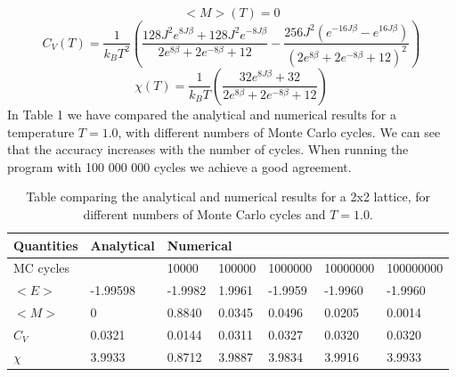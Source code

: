 \documentclass{article}
\begin{document}
$$<M>(T) = 0$$
$$C_V(T) = \frac{1}{k_B T^2}(\frac{128J^2e^{8J\beta}+128J^2e^{-8J\beta}}{ 2e^{8\beta} + 2e^{-8\beta} +12} - \frac{256J^2(e^{-16J\beta}-e^{16J\beta})}{ (2e^{8\beta} + 2e^{-8\beta} +12)^2}) $$
$$\chi (T)= \frac{1}{k_B T}(\frac{32e^{8J\beta}+32}{ 2e^{8\beta} + 2e^{-8\beta} +12 })$$
In Table 1 we have compared the analytical and numerical results for a temperature $T = 1.0$, with different numbers of Monte Carlo cycles. We can see that the accuracy increases with the number of cycles. When running the program with 100 000 000 cycles we achieve a good agreement. 
\begin{center}
\begin{table}
\centering
\label{my-label}
\begin{tabular}{|l|l|l|l|l|l|l|l|}
\hline
Quantities & \multicolumn{2}{l|}{Analytical} & \multicolumn{5}{l|}{Numerical}                    \\ \hline
MC cycles  & \multicolumn{2}{l|}{}           & 10000   & 100000 & 1000000 & 10000000 & 100000000 \\ \hline
$<E>$      & \multicolumn{2}{l|}{-1.99598}   & -1.9982 & 1.9961 & -1.9959 & -1.9960  & -1.9960   \\ \hline
$<M>$      & \multicolumn{2}{l|}{0}          & 0.8840  & 0.0345 & 0.0496  & 0.0205   & 0.0014    \\ \hline
$C_V$      & \multicolumn{2}{l|}{0.0321}     & 0.0144  & 0.0311 & 0.0327  & 0.0320   & 0.0320    \\ \hline
$\chi$     & \multicolumn{2}{l|}{3.9933}     & 0.8712  & 3.9887 & 3.9834  & 3.9916   & 3.9933    \\ \hline
\end{tabular}
\caption{Table comparing the analytical and numerical results for a 2x2 lattice, for different numbers of Monte Carlo cycles and $T = 1.0$.}
\end{table}
\end{center}
\end{document}
